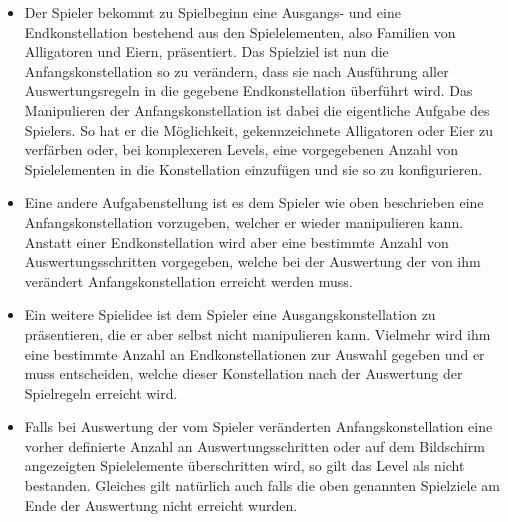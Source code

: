 	\begin{itemize}

		\item Der Spieler bekommt zu Spielbeginn eine Ausgangs- und eine Endkonstellation bestehend aus den Spielelementen, also Familien von Alligatoren und Eiern, präsentiert. Das Spielziel ist nun die Anfangskonstellation so zu verändern, dass sie nach Ausführung aller Auswertungsregeln in die gegebene Endkonstellation überführt wird. Das Manipulieren der Anfangskonstellation ist dabei die eigentliche Aufgabe des Spielers. So hat er die Möglichkeit, gekennzeichnete Alligatoren oder Eier zu verfärben oder, bei komplexeren Levels, eine vorgegebenen Anzahl von Spielelementen in die Konstellation einzufügen und sie so zu konfigurieren.

		\item Eine andere Aufgabenstellung ist es dem Spieler wie oben beschrieben eine Anfangskonstellation vorzugeben, welcher er wieder manipulieren kann. Anstatt einer Endkonstellation wird aber eine bestimmte Anzahl von Auswertungsschritten vorgegeben, welche bei der Auswertung der von ihm verändert Anfangskonstellation erreicht werden muss.

		\item Ein weitere Spielidee ist dem Spieler eine Ausgangskonstellation zu präsentieren, die er aber selbst nicht manipulieren kann.
		Vielmehr wird ihm eine bestimmte Anzahl an Endkonstellationen zur Auswahl gegeben und er muss entscheiden, welche dieser Konstellation nach der Auswertung der Spielregeln erreicht wird.

		\item Falls bei Auswertung der vom Spieler veränderten Anfangskonstellation eine vorher definierte Anzahl an Auswertungsschritten oder auf dem Bildschirm angezeigten Spielelemente überschritten wird, so gilt das Level als nicht bestanden.
		Gleiches gilt natürlich auch falls die oben genannten Spielziele am Ende der Auswertung nicht erreicht wurden.
	\end{itemize}


